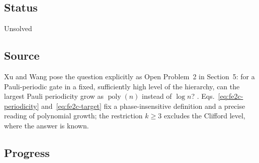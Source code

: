\subsection*{Status}

Unsolved

\subsection*{Source}

Xu and Wang pose the question explicitly as Open Problem~2 in Section~5:
for a Pauli-periodic gate in a fixed, sufficiently high level of the
hierarchy, can the largest Pauli periodicity grow as $\operatorname{poly}(n)$
instead of $\log n$? .
Eqs.~\eqref{eq:fe2c-periodicity} and~\eqref{eq:fe2c-target} fix a
phase-insensitive definition and a precise reading of polynomial growth; the
restriction $k\geq3$ excludes the Clifford level, where the answer is known.

\subsection*{Progress}

